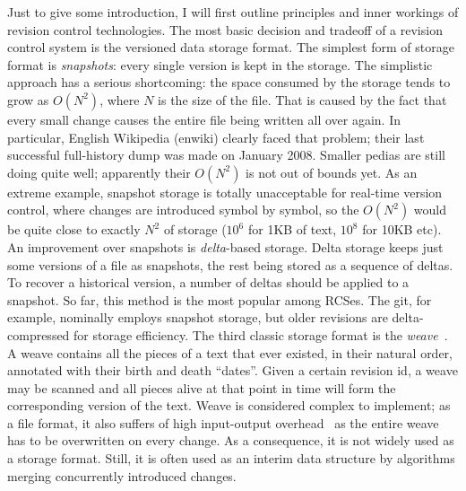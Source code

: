 \documentclass{acm_proc_article-sp}
\begin{document}
Just to give some introduction, I will first outline principles and inner workings of revision control technologies.
The most basic decision and tradeoff of a revision control system is the versioned data storage format.
The simplest form of storage format is \emph{snapshots}: every single  version is kept in the storage.
The simplistic approach has a serious shortcoming: the space consumed by the storage tends to grow as $O(N^2)$, where $N$ is the size of the file.
That is caused by the fact that every small change causes the entire file being written all over again.
In particular, English Wikipedia (enwiki) clearly faced that problem; their last successful full-history dump was made on January 2008.
Smaller pedias are still doing quite well; apparently their $O(N^2)$ is not out of bounds yet.
As an extreme example, snapshot storage is totally unacceptable for real-time version control, where changes are introduced symbol by symbol, so the $O(N^2)$ would be quite close to exactly $N^2$ of storage ($10^{6}$ for 1KB of text, $10^{8}$ for 10KB etc).
An improvement over snapshots is \emph{delta}-based storage.
Delta storage keeps just some versions of a file as snapshots, the rest being stored as a sequence of deltas.
To recover a historical version, a number of deltas should be applied to a snapshot.
So far, this method is the most popular among RCSes.
The git, for example, nominally employs snapshot storage, but older revisions are delta-compressed for storage efficiency. 
The third classic storage format is the  \emph{weave}~\cite{rcs-txt,revctrl-weave}. 
A weave contains all the pieces of a text that ever existed, in their natural order, annotated with their birth and death ``dates''.
Given a certain revision id, a weave may be scanned and all pieces alive at that point in time will form the corresponding version of the text.
Weave is considered complex to implement; as a file format, it also suffers of high input-output overhead~\cite{bazaar-weave} as the entire weave has to be overwritten on every change.
As a consequence, it is not widely used as a storage format.
Still, it is often used as an interim data structure by algorithms merging concurrently introduced changes.
\end{document}
